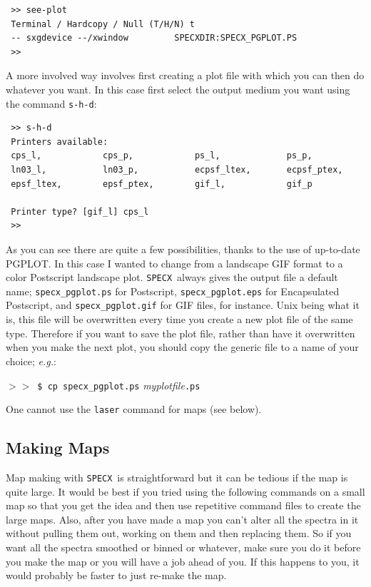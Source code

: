\documentclass[11pt,twoside]{article}
\newcommand{\eg}{{\it e.g.}}
\newcommand{\SPECX}{{\tt SPECX}}
\newcommand{\SP}{{$>\!>$}}
\begin{document}
\begin{verbatim}
 >> see-plot
 Terminal / Hardcopy / Null (T/H/N) t
 -- sxgdevice --/xwindow         SPECXDIR:SPECX_PGPLOT.PS
 >>
\end{verbatim}

A more involved way involves first creating a plot file with which you
can then do whatever you want. In this case first select the output
medium you want using the command {\tt s-h-d}:

\begin{verbatim}
 >> s-h-d
 Printers available:
 cps_l,            cps_p,            ps_l,             ps_p,
 ln03_l,           ln03_p,           ecpsf_ltex,       ecpsf_ptex,
 epsf_ltex,        epsf_ptex,        gif_l,            gif_p

 Printer type? [gif_l] cps_l
 >>
\end{verbatim}

As you can see there are quite a few possibilities, thanks to the use
of up-to-date PGPLOT. In this case I wanted to change from a landscape
GIF format to a color Postscript landscape plot. \SPECX\ always gives
the output file a default name; \verb|specx_pgplot.ps| for Postscript,
\verb|specx_pgplot.eps| for Encapsulated Postscript,
and \verb|specx_pgplot.gif| for GIF files, for instance. Unix being
what it is, this file will be overwritten every time you create a new
plot file of the same type.  Therefore if you want to save the plot
file, rather than have it overwritten when you make the next plot, you
should copy the generic file to a name of your choice; \eg :

\SP\ \verb|$ cp specx_pgplot.ps| {\it myplotfile}{\tt .ps}


One cannot use the {\tt laser} command for maps (see below).

\subsection{Making Maps}
\label{sec:specx_13}
Map making with \SPECX\ is straightforward but it can be tedious if
the map is quite large.  It would be best if you tried using the
following commands on a small map so that you get the idea and then
use repetitive command files to create the large maps.  Also, after
you have made a map you can't alter all the spectra in it without
pulling them out, working on them and then replacing them.  So if you
want all the spectra smoothed or binned or whatever, make sure you do
it before you make the map or you will have a job ahead of you. If
this happens to you, it would probably be faster to just re-make the
map.
\end{document}
